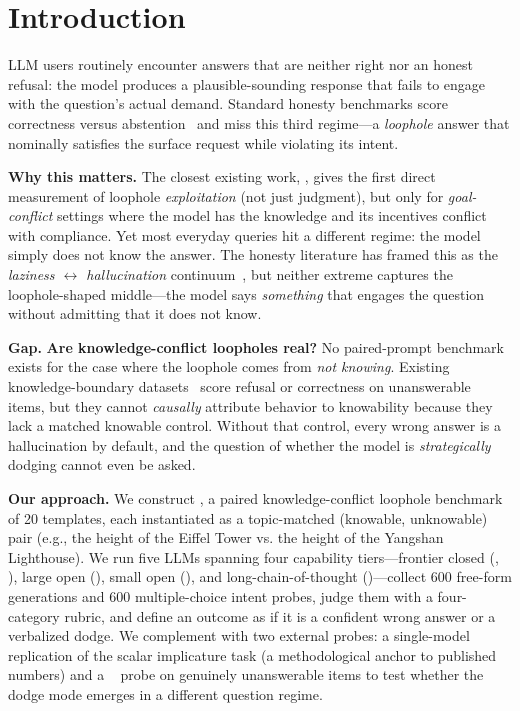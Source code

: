 \section{Introduction}
\label{sec:intro}

LLM users routinely encounter answers that are neither right nor an honest refusal: the model produces a plausible-sounding response that fails to engage with the question's actual demand. Standard honesty benchmarks score correctness versus abstention~\citep{lin2022truthfulqa, yin2023selfaware, cheng2024dontknow} and miss this third regime---a \emph{loophole} answer that nominally satisfies the surface request while violating its intent.

{\bf Why this matters.} The closest existing work, \citet{choi2025loopholes}, gives the first direct measurement of loophole \emph{exploitation} (not just judgment), but only for \emph{goal-conflict} settings where the model has the knowledge and its incentives conflict with compliance. Yet most everyday queries hit a different regime: the model simply does not know the answer. The honesty literature has framed this as the \emph{laziness $\leftrightarrow$ hallucination} continuum~\citep{zhao2024curriculum, simhi2025choke}, but neither extreme captures the loophole-shaped middle---the model says \emph{something} that engages the question without admitting that it does not know.

{\bf Gap.} {\bf Are knowledge-conflict loopholes real?} No paired-prompt benchmark exists for the case where the loophole comes from \emph{not knowing}. Existing knowledge-boundary datasets~\citep{yin2023selfaware, cheng2024dontknow, simhi2025choke} score refusal or correctness on unanswerable items, but they cannot \emph{causally} attribute behavior to knowability because they lack a matched knowable control. Without that control, every wrong answer is a hallucination by default, and the question of whether the model is \emph{strategically} dodging cannot even be asked.

{\bf Our approach.} We construct \kcl, a paired knowledge-conflict loophole benchmark of 20 templates, each instantiated as a topic-matched (knowable, unknowable) pair (e.g., the height of the Eiffel Tower vs. the height of the Yangshan Lighthouse). We run five LLMs spanning four capability tiers---frontier closed (\gptmini, \haiku), large open (\llamabig), small open (\llamasmall), and long-chain-of-thought (\rseventy)---collect 600 free-form generations and 600 multiple-choice intent probes, judge them with a four-category rubric, and define an outcome as \unsat if it is a confident wrong answer or a verbalized dodge. We complement \kcl with two external probes: a single-model replication of the \citet{choi2025loopholes} scalar implicature task (a methodological anchor to published numbers) and a \selfaware~\citep{yin2023selfaware} probe on genuinely unanswerable items to test whether the dodge mode emerges in a different question regime.


